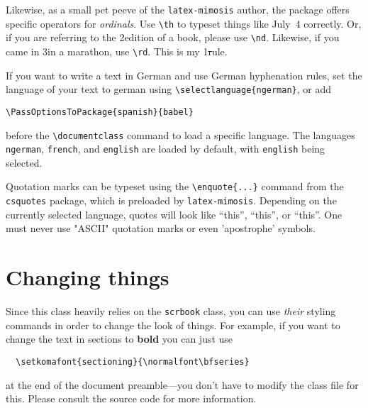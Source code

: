 Likewise, as a small pet peeve of the \texttt{latex-mimosis} author, the package offers specific operators for
\emph{ordinals}. Use \verb|\th| to typeset things like July~4\th
correctly. Or, if you are referring to the 2\nd edition of a book,
please use \verb|\nd|. Likewise, if you came in 3\rd in a marathon, use
\verb|\rd|. This is my 1\st rule.

If you want to write a text in German and use German hyphenation rules, set the language of your text to german using \verb|\selectlanguage{ngerman}|, or add
\begin{verbatim}
\PassOptionsToPackage{spanish}{babel}
\end{verbatim}
before the \verb|\documentclass| command to load a specific language. The languages \verb|ngerman|, \verb|french|, and \verb|english| are loaded by default, with \verb|english| being selected.

Quotation marks can be typeset using the \verb|\enquote{...}| command from the \verb|csquotes| package, which is preloaded by \verb|latex-mimosis|.
Depending on the currently selected language, quotes will look like \enquote{this},
\enquote{this},
or
\enquote{this}.
One must never use "ASCII" quotation marks or even 'apostrophe' symbols.

\section{Changing things}

Since this class heavily relies on the \verb|scrbook| class, you can use
\emph{their} styling commands in order to change the look of things. For
example, if you want to change the text in sections to \textbf{bold} you
can just use
%
\begin{verbatim}
  \setkomafont{sectioning}{\normalfont\bfseries}
\end{verbatim}
%
at the end of the document preamble---you don't have to modify the class
file for this. Please consult the source code for more information.
